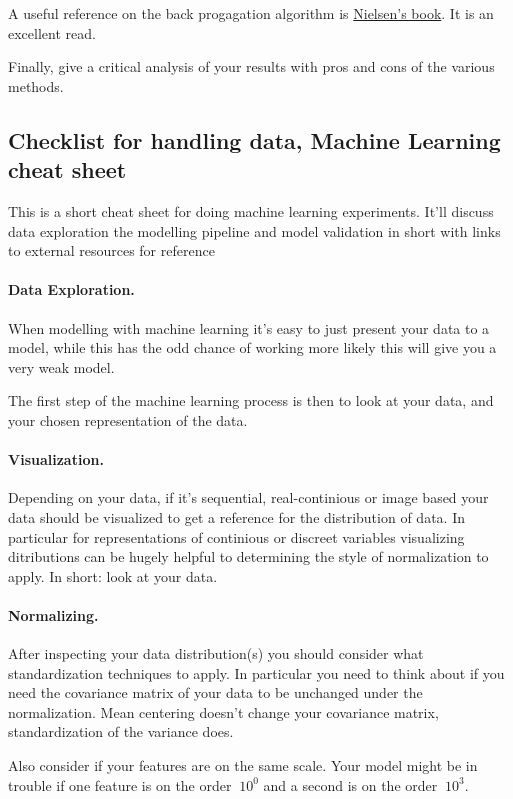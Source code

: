 \documentclass[%
oneside,                 %
final,                   %
10pt]{article}
\begin{document}
A useful reference on the back progagation algorithm is \href{{http://neuralnetworksanddeeplearning.com/}}{Nielsen's book}. It is an excellent read.


Finally, give a critical analysis of your results with pros and cons of the various methods. 



\subsection*{Checklist for handling data, Machine Learning cheat sheet}


This is a short cheat sheet for doing machine learning
experiments. It'll discuss data exploration the modelling pipeline and
model validation in short with links to external resources for
reference

\paragraph{Data Exploration.}
When modelling with machine learning it's easy to just present your
data to a model, while this has the odd chance of working more likely
this will give you a very weak model.

The first step of the machine learning process is then to look at your
data, and your chosen representation of the data.

\paragraph{Visualization.}
Depending on your data, if it's sequential, real-continious or image
based your data should be visualized to get a reference for the
distribution of data. In particular for representations of continious
or discreet variables visualizing ditributions can be hugely helpful
to determining the style of normalization to apply. In short: look at
your data.

\paragraph{Normalizing.}
After inspecting your data distribution(s) you should consider what
standardization techniques to apply. In particular you need to think
about if you need the covariance matrix of your data to be unchanged
under the normalization. Mean centering doesn't change your covariance
matrix, standardization of the variance does.

Also consider if your features are on the same scale. Your model might
be in trouble if one feature is on the order $~10^0$ and a second is
on the order $~10^3$.
\end{document}

